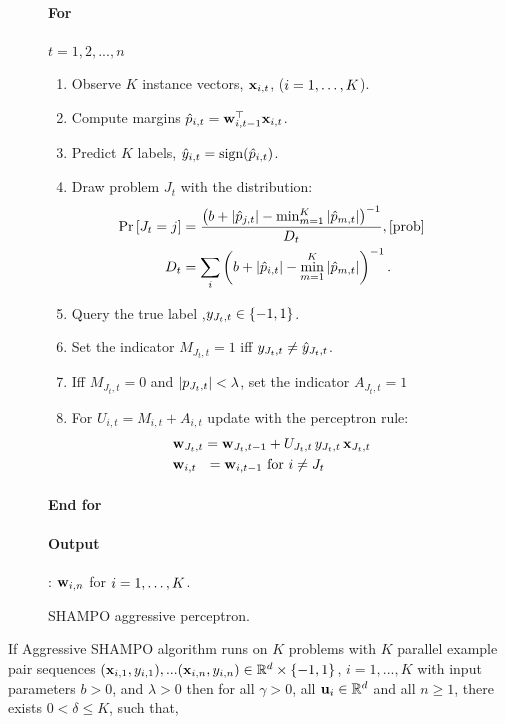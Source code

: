 {\begin{figure}[h]
\paragraph{For}  {$t=1,2, ..., n$} 
\begin{enumerate}
\nolineskips
\item Observe $K$ instance vectors, $\mathbf{x}_{i,t}$, ($i=1 , \ldots , K$).
\item Compute margins $\hat{p}_{i,t}={\mathbf{w}}^{\top}_{i,t-1} \mathbf{x}_{i,t}$.
\item Predict $K$ labels, $\hat{y}_{i,t}={\rm sign}(\hat{p}_{i,t})$.
\item Draw problem $J_t$  with the distribution:
\begin{align}
\pr{J_t=j} &=
\frac{\paren{b+\abs{\hat{p}_{j,t}}-\min_{m=1}^K\abs{\hat{p}_{m,t}}}^{-1}}{D_{t}}, \eqref{prob}\nonumber\\
D_t &=
\sum_i \paren{b+\abs{\hat{p}_{i,t}}-\min_{m=1}^K\abs{\hat{p}_{m,t}}}^{-1}. \nonumber
\end{align}
\item Query the true label ,$y_{J_t,t}\in\{-1,1\}$.
\item Set the indicator $M_{J_t, t}=1$ iff $y_{J_t,t} \neq \hat{y}_{J_t,t}$.
\item Iff $M_{J_t, t}=0$ and $\left\vert{p_{J_t,t}}\right\vert<\lambda$, set  the indicator $A_{J_t,t}=1$
\item For $U_{i,t}=M_{i,t}+A_{i,t}$ update with the perceptron rule:
\begin{align}
&\mathbf{w}_{J_t,t} = \mathbf{w}_{J_t,t-1}+U_{J_t,t} \, y_{J_t,t}\, \mathbf{x}_{J_t,t} \\
&\mathbf{w}_{i,t} ~~= \mathbf{w}_{i,t-1}  \textrm{ for } i \neq J_t \nonumber
\end{align}
\end{enumerate}
\paragraph{End for} 
\paragraph{Output}: $\mathbf{w}_{i,n}$ for $i=1 , \ldots , K$.
\caption{SHAMPO aggressive perceptron. \label{alg:SHAMPO_FO}}
\end{figure}        


\begin{theorem}
  If Aggressive SHAMPO algorithm runs on $K$ problems with $K$ parallel example pair
  sequences
  $(\mathbf{x}_{i,1},y_{i,1}),...(\mathbf{x}_{i,n},y_{i,n})\in\mathbb{R}^d\times\{-1,1\}$,
  $i=1,...,K$ with input parameters $b>0$, and $\lambda>0$ then for all $\gamma>0$, all
  $\mathbf{u}_{i}\in\mathbb{R}^d$ and all $n\ge1$, there exists $0<\delta\le K$, such that,
  

\end{theorem}}
